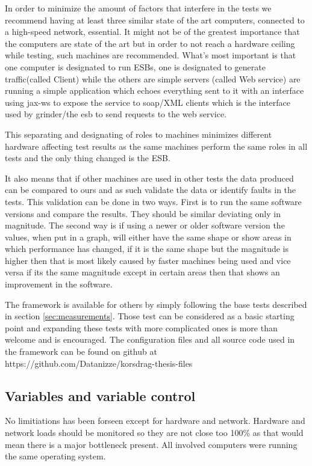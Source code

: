 In order to minimize the amount of factors that interfere in the tests we recommend having at least three similar state of the art computers, connected to a high-speed network, essential.
It might not be of the greatest importance that the computers are state of the art but in order to not reach a hardware ceiling while testing, such machines are recommended. 
What's most important is that one computer is designated to run ESBs, one is designated to generate traffic(called Client) while the others are simple servers (called Web service) are running a simple application which echoes everything sent to it with an interface using jax-ws to expose the service to soap/XML clients which is the interface used by grinder/the esb to send requests to the web service.

This separating and designating of roles to machines minimizes different hardware affecting test results as the same machines perform the same roles in all tests and the only thing changed is the ESB. 

It also means that if other machines are used in other tests the data produced can be compared to ours and as such validate the data or identify faults in the tests. 
This validation can be done in two ways. 
First is to run the same software versions and compare the results. 
They should be similar deviating only in magnitude. The second way is if using a newer or older software version the values, when put in a graph, will either have the same shape or show areas in which performance has changed, 
if it is the same shape but the magnitude is higher then that is most likely caused by faster machines being used and vice versa if its the same magnitude except in certain areas then that shows an improvement in the software.

The framework is available for others by simply following the base tests described in section \ref{sec:measurements}. Those test can be considered as a basic starting point and expanding these tests with more complicated ones is more than welcome and is encouraged.
The configuration files and all source code used in the framework can be found on github at https://github.com/Datanizze/korsdrag-thesis-files

\subsection{Variables and variable control}
No limitiations has been forseen except for hardware and network.
Hardware and network loads should be monitored so they are not close too 100\% as that would mean there is a major bottleneck present. 
All involved computers were running the same operating system.

